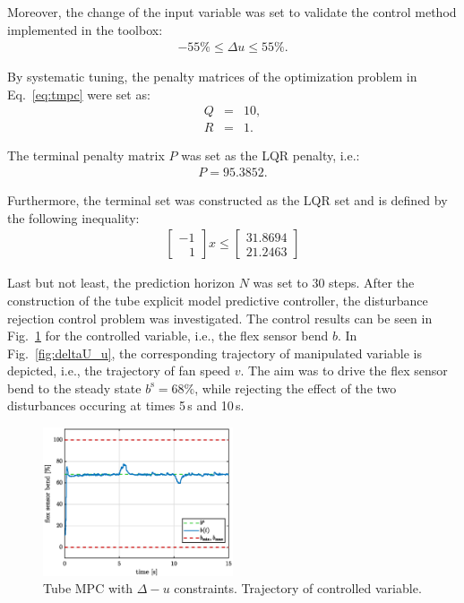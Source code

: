 \documentclass[letterpaper, 10 pt, conference]{ieeeconf}
\begin{document}
Moreover, the change of the input variable was set to validate the control method implemented in the toolbox:
\begin{eqnarray}
	\label{eq:const_du}
	-55\% \le \Delta u \le 55\%.
\end{eqnarray}

By systematic tuning, the penalty matrices of the optimization problem in Eq.~\eqref{eq:tmpc} were set as:
\begin{subequations}
	\label{eq:setup_penalty} 
	\begin{eqnarray}
		\label{eq:setup_Q}
		Q &=& 10, \\
		\label{eq:setup_R}
		R &=& 1.
	\end{eqnarray}
\end{subequations}

The terminal penalty matrix $P$ was set as the LQR penalty, i.e.:
\begin{eqnarray}
	\label{eq:setup_P}
	P = 95.3852.
\end{eqnarray}

Furthermore, the terminal set was constructed as the LQR set and is defined by the following inequality:
\begin{eqnarray}
	\label{eq:setup_terminal_set}
	\begin{bmatrix}
	-1 \\	
	\,\,\,\,\, 1
	\end{bmatrix} x \le 
	\begin{bmatrix}
		31.8694\\	
		21.2463
	\end{bmatrix}
\end{eqnarray}

Last but not least, the prediction horizon $N$ was set to 30 steps. After the construction of the tube explicit model predictive controller, the disturbance rejection control problem was investigated. The control results can be seen in Fig.~\ref{fig:deltaU_y} for the controlled variable, i.e., the flex sensor bend $b$. In Fig.~\ref{fig:deltaU_u}, the corresponding trajectory of manipulated variable is depicted, i.e., the trajectory of fan speed $v$. The aim was to drive the flex sensor bend to the steady state $ b^\mathrm{s} = 68\%$, while rejecting the effect of the two disturbances occuring at times 5\,s and 10\,s. 

\begin{figure}
	\begin{center}
		\includegraphics[width=0.5\textwidth]{images/deltaU_b_new.eps}
		\caption{Tube MPC with $\Delta - u$ constraints. Trajectory of controlled variable.}
		\label{fig:deltaU_y}
	\end{center}
\end{figure}
\end{document}

